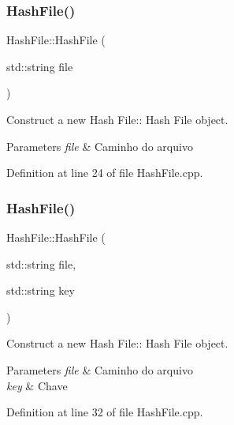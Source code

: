 \subsubsection{\texorpdfstring{Hash\+File()}{HashFile()}\hspace{0.1cm}{\footnotesize\ttfamily [1/2]}}
{\footnotesize\ttfamily Hash\+File\+::\+Hash\+File (\begin{DoxyParamCaption}\item[{std\+::string}]{file }\end{DoxyParamCaption})}



Construct a new Hash File\+:\+: Hash File object. 


\begin{DoxyParams}{Parameters}
{\em file} & Caminho do arquivo \\
\hline
\end{DoxyParams}


Definition at line 24 of file Hash\+File.\+cpp.

\mbox{\label{class_hash_file_afe9a013898ac44694779d413eba3b196}} 
\subsubsection{\texorpdfstring{Hash\+File()}{HashFile()}\hspace{0.1cm}{\footnotesize\ttfamily [2/2]}}
{\footnotesize\ttfamily Hash\+File\+::\+Hash\+File (\begin{DoxyParamCaption}\item[{std\+::string}]{file,  }\item[{std\+::string}]{key }\end{DoxyParamCaption})}



Construct a new Hash File\+:\+: Hash File object. 


\begin{DoxyParams}{Parameters}
{\em file} & Caminho do arquivo \\
\hline
{\em key} & Chave \\
\hline
\end{DoxyParams}


Definition at line 32 of file Hash\+File.\+cpp.

\mbox{\label{class_hash_file_a88cce5bf687611a893fbf728c609f4d2}} 
